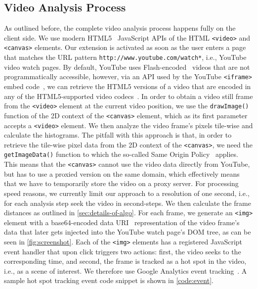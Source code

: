 \documentclass[10pt,twocolumn,letterpaper]{article}
\begin{document}
\subsection{Video Analysis Process}
As outlined before, the complete video analysis process happens fully on the client side. We use modern HTML5~\cite{w3c_html5} JavaScript APIs of the HTML \texttt{<video>} and \texttt{<canvas>} elements. Our extension is activated as soon as the user enters a page that matches the URL pattern \texttt{http://www.youtube.com/watch*}, i.e., YouTube video watch pages. By default, YouTube uses Flash-encoded~\cite{flash} videos that are not programmatically accessible, however, via an API used by the YouTube \texttt{<iframe>} embed code~\cite{youtubeiframe}, we can retrieve the HTML5 versions of a video that are encoded in any of the HTML5-supported video codecs~\cite{html5video}. In order to obtain a video still frame from the \texttt{<video>} element at the current video position, we use the \texttt{drawImage()} function of the 2D context of the \texttt{<canvas>} element, which as its first parameter accepts a \texttt{<video>} element. We then analyze the video frame's pixels tile-wise and calculate the histograms. The pitfall with this approach is that, in order to retrieve the tile-wise pixel data from the 2D context of the \texttt{<canvas>}, we need the \texttt{getImageData()} function to which the so-called Same Origin Policy~\cite{sameoriginpolicy} applies. This means that the \texttt{<canvas>} cannot use the video data directly  from YouTube, but has to use a proxied version on the same domain, which effectively means that we have to temporarily store the video on a proxy server. For processing speed reasons, we currently limit our approach to a resolution of one second, i.e., for each analysis step seek the video in second-steps. We then calculate the frame distances as outlined in \autoref{sec:details-of-algo}. For each frame, we generate an \texttt{<img>} element with a base64-encoded data URI~\cite{datauri} representation of the video frame's data that later gets injected into the YouTube watch page's DOM tree, as can be seen in \autoref{fig:screenshot}. Each of the \texttt{<img>} elements has a registered JavaScript event handler that upon click triggers two actions: first, the video seeks to the corresponding time, and second, the frame is tracked as a hot spot in the video, i.e., as a scene of interest. We therefore use Google Analytics event tracking~\cite{analyticsevent}. A sample hot spot tracking event code snippet is shown in \autoref{code:event}.
\end{document}
